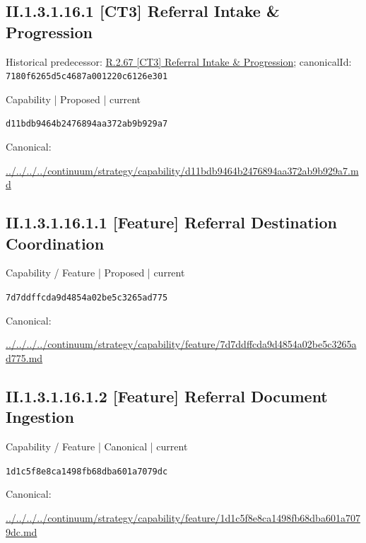 \documentclass[10pt,a4paper]{article}
\begin{document}
\subsection*{II.1.3.1.16.1 [CT3] Referral Intake \& Progression}
Historical predecessor: \hyperref[element-7180f6265d5c4687a001220c6126e301]{R.2.67 [CT3] Referral Intake \& Progression}; canonicalId: \texttt{7180f6265d5c4687a001220c6126e301}\par
\label{element-d11bdb9464b2476894aa372ab9b929a7}
{\small Capability | Proposed | current}\par
\texttt{d11bdb9464b2476894aa372ab9b929a7}\par
Canonical: \par
{\footnotesize\url{../../../../continuum/strategy/capability/d11bdb9464b2476894aa372ab9b929a7.md}}\par
\subsection*{II.1.3.1.16.1.1 [Feature] Referral Destination Coordination}
\label{element-7d7ddffcda9d4854a02be5c3265ad775}
{\small Capability / Feature | Proposed | current}\par
\texttt{7d7ddffcda9d4854a02be5c3265ad775}\par
Canonical: \par
{\footnotesize\url{../../../../continuum/strategy/capability/feature/7d7ddffcda9d4854a02be5c3265ad775.md}}\par
\subsection*{II.1.3.1.16.1.2 [Feature] Referral Document Ingestion}
\label{element-1d1c5f8e8ca1498fb68dba601a7079dc}
{\small Capability / Feature | Canonical | current}\par
\texttt{1d1c5f8e8ca1498fb68dba601a7079dc}\par
Canonical: \par
{\footnotesize\url{../../../../continuum/strategy/capability/feature/1d1c5f8e8ca1498fb68dba601a7079dc.md}}\par
\end{document}
